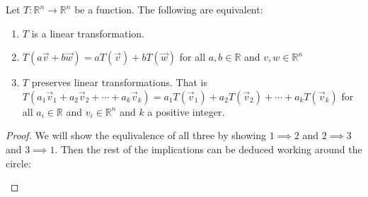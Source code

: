 \begin{theorem}
Let $T:\mathbb{R}^n\to\mathbb{R}^n$ be a function. The following are equivalent:
\begin{enumerate}
\item $T$ is a linear transformation.
\item $T(a\vec{v}+b\vec{w})=aT(\vec{v})+bT(\vec{w})$ for all $a,b \in \mathbb{R}$ and $v,w \in \mathbb{R}^n$
\item $T$ preserves linear transformations. That is \\
$T(a_1\vec{v}_1+a_2\vec{v}_2+\cdots+a_k\vec{v}_k)=
a_1T(\vec{v}_1)+a_2T(\vec{v}_2)+\cdots+a_kT(\vec{v}_k)$ 
for all $a_i \in \mathbb{R}$ and $v_i \in \mathbb{R}^n$ and $k$ a positive integer.
\end{enumerate}
\end{theorem}

\begin{proof}
We will show the equlivalence of all three by showing $1 \implies 2$ and $2 \implies 3$ and $3 \implies 1$. 
Then the rest of the implications can be deduced working around the circle:\\
\begin{center}
\end{center}

\end{proof}


